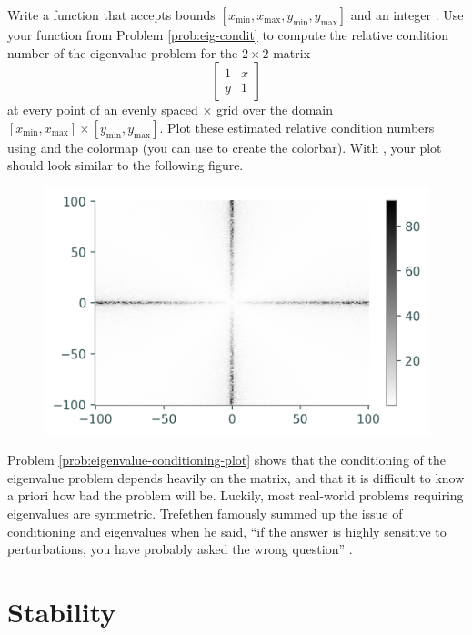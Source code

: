 \begin{problem}
Write a function that accepts bounds $[x_{\min},x_{\max},y_{\min},y_{\max}]$ and an integer .
Use your function from Problem \ref{prob:eig-condit} to compute the relative condition number of the eigenvalue problem for the $2\times 2$ matrix
\[
\left[\begin{array}{cc}
1 &  x\\
y & 1\end{array}\right]
\]
at every point of an evenly spaced $\times$ grid over the domain $[x_{\min}, x_{\max}]\times [y_{\min}, y_{\max}]$.
Plot these estimated relative condition numbers using  and the colormap  (you can use  to create the colorbar).
With , your plot should look similar to the following figure.

\begin{figure}[H]
    \includegraphics[width=.7\linewidth]{figures/eigenvalue_conditioning.png}
\end{figure}

\label{prob:eigenvalue-conditioning-plot}
\end{problem}

Problem \ref{prob:eigenvalue-conditioning-plot} shows that the conditioning of the eigenvalue problem depends heavily on the matrix, and that it is difficult to know a priori how bad the problem will be.
Luckily, most real-world problems requiring eigenvalues are symmetric.
Trefethen famously summed up the issue of conditioning and eigenvalues when he said, ``if the answer is highly sensitive to perturbations, you have probably asked the wrong question'' \cite{Trefethen1998}.

\section*{Stability} %

